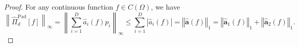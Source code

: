\documentclass{svjour3}
\begin{document}
\begin{proof}
For any continuous function $f\in C(\Omega)$, we have
	\begin{equation} \label{eq:comoda}
\left\lVert \hat{\Pi}_d^{\mathrm{Pad}} [f] \right\rVert_\infty = \left\lVert \sum_{i=1}^D \hat{{a}}_i (f) p_i \right\rVert_\infty \leq \sum_{i=1}^D \left\lvert \hat{{a}}_i (f) \right\rvert = \left\Vert \hat{\boldsymbol{a}} (f) \right\Vert_1 = \left\Vert \hat{\boldsymbol{a}}_1 (f) \right\Vert_1 + \left\Vert \hat{\boldsymbol{a}}_2 (f) \right\Vert_1.
		\end{equation}

\end{proof}
\end{document}
